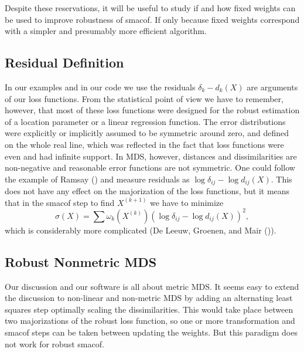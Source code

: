 \documentclass[
  12pt,
  letterpaper,
  DIV=11,
  numbers=noendperiod]{scrartcl}
\theoremstyle{definition}
\theoremstyle{plain}
\theoremstyle{plain}
\theoremstyle{remark}
\begin{document}
Despite these reservations, it will be useful to study if and how fixed
weights can be used to improve robustness of smacof. If only because
fixed weights correspond with a simpler and presumably more efficient
algorithm.

\subsection{Residual Definition}\label{residual-definition}

In our examples and in our code we use the residuals \(\delta_k-d_k(X)\)
are arguments of our loss functions. From the statistical point of view
we have to remember, however, that most of these loss functions were
designed for the robust estimation of a location parameter or a linear
regression function. The error distributions were explicitly or
implicitly assumed to be symmetric around zero, and defined on the whole
real line, which was reflected in the fact that loss functions were even
and had infinite support. In MDS, however, distances and dissimilarities
are non-negative and reasonable error functions are not symmetric. One
could follow the example of Ramsay () and
measure residuals as \(\log\delta_{ij}-\log d_{ij}(X)\). This does not
have any effect on the majorization of the loss functions, but it means
that in the smacof step to find \(X^{(k+1)}\) we have to minimize \[
\sigma(X)=\sum \omega_k(X^{(k)})(\log\delta_{ij}-\log d_{ij}(X))^2,
\] which is considerably more complicated (De Leeuw, Groenen, and Mair
()).

\subsection{Robust Nonmetric MDS}\label{robust-nonmetric-mds}

Our discussion and our software is all about metric MDS. It seems easy
to extend the discussion to non-linear and non-metric MDS by adding an
alternating least squares step optimally scaling the dissimilarities.
This would take place between two majorizations of the robust loss
function, so one or more transformation and smacof steps can be taken
between updating the weights. But this paradigm does not work for robust
smacof.
\end{document}
